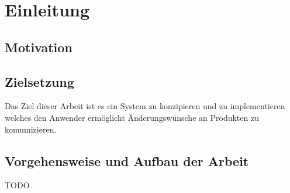 \chapter{Einleitung}

\section{Motivation}


\section{Zielsetzung}

Das Ziel dieser Arbeit ist es ein System zu konzipieren und zu implementieren welches den Anwender ermöglicht Änderungswünsche an Produkten 
zu komumizieren. 

\section{Vorgehensweise und Aufbau der Arbeit}
TODO